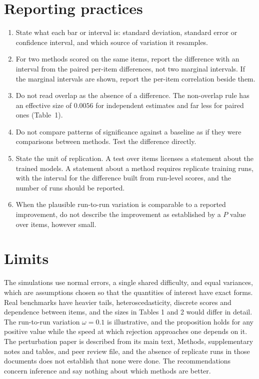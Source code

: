 \documentclass[11pt]{article}
\theoremstyle{definition}
\begin{document}
\section{Reporting practices}

\begin{enumerate}
\item State what each bar or interval is: standard deviation, standard error or confidence interval, and which source of variation it resamples.
\item For two methods scored on the same items, report the difference with an interval from the paired per-item differences, not two marginal intervals. If the marginal intervals are shown, report the per-item correlation beside them.
\item Do not read overlap as the absence of a difference. The non-overlap rule has an effective size of $0.0056$ for independent estimates and far less for paired ones (Table~1).
\item Do not compare patterns of significance against a baseline as if they were comparisons between methods. Test the difference directly.
\item State the unit of replication. A test over items licenses a statement about the trained models. A statement about a method requires replicate training runs, with the interval for the difference built from run-level scores, and the number of runs should be reported.
\item When the plausible run-to-run variation is comparable to a reported improvement, do not describe the improvement as established by a $P$ value over items, however small.
\end{enumerate}

\section{Limits}

The simulations use normal errors, a single shared difficulty, and equal variances, which are assumptions chosen so that the quantities of interest have exact forms. Real benchmarks have heavier tails, heteroscedasticity, discrete scores and dependence between items, and the sizes in Tables 1 and 2 would differ in detail. The run-to-run variation $\omega=0.1$ is illustrative, and the proposition holds for any positive value while the speed at which rejection approaches one depends on it. The perturbation paper is described from its main text, Methods, supplementary notes and tables, and peer review file, and the absence of replicate runs in those documents does not establish that none were done. The recommendations concern inference and say nothing about which methods are better.
\end{document}
